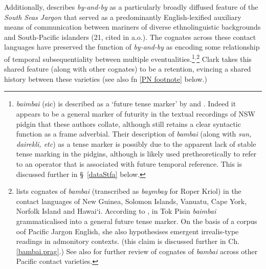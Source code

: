 Additionally, \citet{Clark1979} describes \textit{by-and-by} as a particularly broadly diffused feature of the \textit{South Seas Jargon} that served as a predominantly English-lexified auxiliary means of communication between mariners of diverse ethnolinguistic backgrounds and South-Pacific islanders (21, cited in \citealt[262\textit{ff}]{Harris1986a} a.o.). The cognates across these contact languages have preserved the function of \textit{by-and-by} as encoding some relationship of temporal subsequentiality between multiple eventualities.\footnote{\textit{baimbai} (sic) is described as a `future tense marker' by \citet[112,418,711]{Troy1994} and \citet[268]{Harris1986a}. Indeed it appears to be a general marker of futurity in the textual recordings of NSW pidgin that these authors collate, although still retains a clear syntactic function as a frame adverbial. Their description of \textit{bambai} (along with \textit{sun, dairekli, etc}) as a tense marker is possibly due to the apparent lack of stable tense marking in the pidgins, although is likely used pretheoretically to refer to an operator that is associated with future temporal reference. This is discussed further in §~\ref{dataStfa} below.}$^,$\footnote{\citet[10-11]{Clark1979} lists cognates of \textit{bambai} (transcribed as \textit{baymbay} for Roper Kriol) in the contact languages of New Guinea, Solomon Islands, Vanuatu, Cape York, Norfolk Island and Hawai`i. According to \citet{Romaine1995}, in Tok Pisin \textit{baimbai} grammaticalised into a general future tense marker. On the basis of a corpus oof Pacific Jargon English, she also hypothesises emergent irrealis-type readings in admonitory contexts. (this claim is discussed further in Ch. \ref{bambai.prag}.) See also \citealt{Angelo2016} for further review of cognates of \textit{bambai} across other Pacific contact varieties.} Clark takes this shared feature (along with other cognates) to be a retention, evincing a shared history between these varieties (see also fn \ref{PN footnote} below.) 

